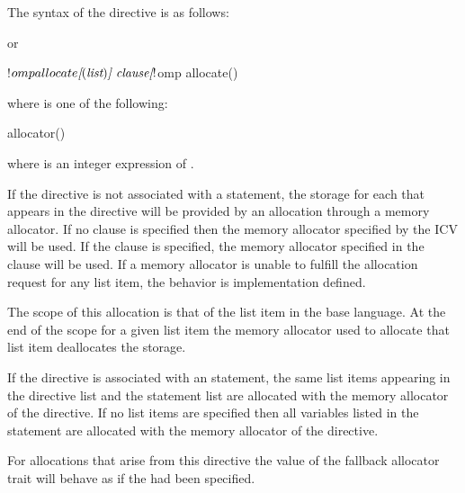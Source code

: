 \begin{fortranspecific}
The syntax of the  directive is as follows:


or
\begin{ompfPragma}
!$omp allocate\plc{[}()\plc{] clause}
\plc{[}!$omp allocate() 
\plc{[...]}
\end{ompfPragma}

where  is one of the following:

\begin{indentedcodelist}
allocator()
\end{indentedcodelist}

where  is an integer expression of  .

\end{fortranspecific}

\descr

If the directive is not associated with a statement, the storage for each  that appears in the directive will be provided by an allocation through a memory allocator. If no clause is specified then the memory allocator specified by the  ICV will be used. If the  clause is specified, the memory allocator specified in the clause will be used. If a memory allocator is unable to fulfill the allocation request for any list item, the behavior is implementation defined.

The scope of this allocation is that of the list item in the base language. At the end of the scope for a given list item the memory allocator used to allocate that list item deallocates the storage.

\begin{fortranspecific}
If the directive is associated with an  statement, the same list items appearing in the directive list and the  statement list are allocated with the memory allocator of the directive.
If no list items are specified then all variables listed in the  statement are allocated with the memory allocator of the directive.
\end{fortranspecific}

For allocations that arise from this directive the  value of the fallback allocator trait will behave as if the  had been specified.

